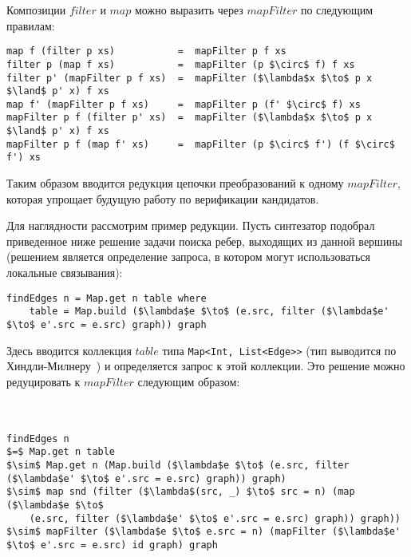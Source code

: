 \documentclass[14pt]{matmex-diploma-custom}
\begin{document}
Композиции $filter$ и $map$ можно выразить через $mapFilter$ по следующим правилам:

\begin{lstlisting}[language=CollectionLang, mathescape=true, frame=none]
map f (filter p xs)           =  mapFilter p f xs
filter p (map f xs)           =  mapFilter (p $\circ$ f) f xs
filter p' (mapFilter p f xs)  =  mapFilter ($\lambda$x $\to$ p x $\land$ p' x) f xs
map f' (mapFilter p f xs)     =  mapFilter p (f' $\circ$ f) xs
mapFilter p f (filter p' xs)  =  mapFilter ($\lambda$x $\to$ p x $\land$ p' x) f xs
mapFilter p f (map f' xs)     =  mapFilter (p $\circ$ f') (f $\circ$ f') xs
\end{lstlisting}

Таким образом вводится редукция цепочки преобразований к одному $mapFilter$, которая упрощает будущую работу по верификации кандидатов.

Для наглядности рассмотрим пример редукции. Пусть синтезатор подобрал приведенное ниже решение задачи поиска ребер, выходящих из данной вершины (решением является определение запроса, в котором могут использоваться локальные связывания):

\begin{lstlisting}[language=SolutionLang, mathescape=true, frame=none]
findEdges n = Map.get n table where
    table = Map.build ($\lambda$e $\to$ (e.src, filter ($\lambda$e' $\to$ e'.src = e.src) graph)) graph
\end{lstlisting}

Здесь вводится коллекция $table$ типа \lstinline[language=SolutionLang]{Map<Int, List<Edge>>} (тип выводится по Хиндли-Милнеру~\cite{Milner}) и определяется запрос к этой коллекции. Это решение можно редуцировать к $mapFilter$ следующим образом:
\\ 
\\ 
\\ 
\begin{lstlisting}[language=SolutionLang, mathescape=true]
findEdges n
$=$ Map.get n table
$\sim$ Map.get n (Map.build ($\lambda$e $\to$ (e.src, filter ($\lambda$e' $\to$ e'.src = e.src) graph)) graph)
$\sim$ map snd (filter ($\lambda$(src, _) $\to$ src = n) (map ($\lambda$e $\to$
    (e.src, filter ($\lambda$e' $\to$ e'.src = e.src) graph)) graph))
$\sim$ mapFilter ($\lambda$e $\to$ e.src = n) (mapFilter ($\lambda$e' $\to$ e'.src = e.src) id graph) graph
\end{lstlisting}
\end{document}
